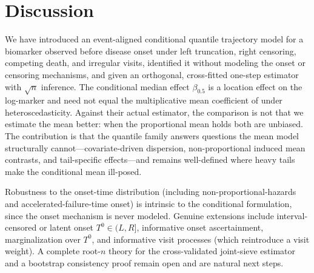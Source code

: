 \documentclass[11pt]{article}
\begin{document}
\section{Discussion}\label{sec:disc}

We have introduced an event-aligned conditional quantile trajectory model for a
biomarker observed before disease onset under left truncation, right censoring,
competing death, and irregular visits, identified it without modeling the onset or
censoring mechanisms, and given an orthogonal, cross-fitted one-step estimator with
$\sqrt n$ inference. The conditional median effect $\beta_{0.5}$ is a location
effect on the log-marker and need not equal the multiplicative mean coefficient of
\citet{sun2025semiparametric} under heteroscedasticity. Against their actual
estimator, the comparison is not that we estimate the mean better: when the
proportional mean holds both are unbiased. The contribution is that the quantile
family answers questions the mean model structurally cannot---covariate-driven
dispersion, non-proportional induced mean contrasts, and tail-specific
effects---and remains well-defined where heavy tails make the conditional mean
ill-posed.

Robustness to the onset-time distribution (including non-proportional-hazards and
accelerated-failure-time onset) is intrinsic to the conditional formulation, since
the onset mechanism is never modeled. Genuine extensions include interval-censored
or latent onset $T^0\in(L,R]$, informative onset ascertainment, marginalization
over $T^0$, and informative visit processes (which reintroduce a visit weight). A
complete root-$n$ theory for the cross-validated joint-sieve estimator and a
bootstrap consistency proof remain open and are natural next steps.



\end{document}
